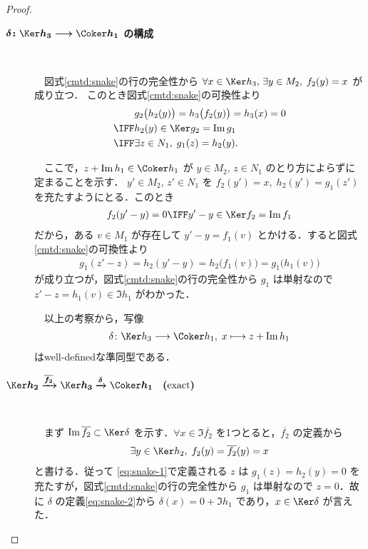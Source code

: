 \documentclass[algtopo_main]{subfiles}
\begin{document}
\begin{proof}
\begin{description}
		\item[\textbf{$\bm{\delta \colon \Ker h_3 \lto \Coker h_1}$ の構成}]　
		
		　図式\ref{cmtd:snake}の行の完全性から $\forall x \in \Ker h_3,\, \exists y \in M_2,\; f_2(y) = x$ が成り立つ．
		このとき図式\ref{cmtd:snake}の可換性より
		\begin{align}
			&g_2 \bigl( h_2(y) \bigr)  = h_3 \bigl( f_2(y) \bigr) = h_3(x) = 0 \\
			\IFF &h_2(y) \in \Ker g_2 = \Im g_1 \\
			\IFF &\exists z \in N_1,\; g_1(z) = h_2(y). \label{eq:snake-1}
		\end{align}
		
		　ここで，$z + \Im h_1 \in \Coker h_1$ が $y \in M_2,\, z \in N_1$ のとり方によらずに定まることを示す．
		$y' \in M_2,\, z' \in N_1$ を $f_2(y') = x,\; h_2(y') = g_1(z')$ を充たすようにとる．このとき
		\begin{align}
			f_2(y' - y) = 0 \IFF y' -y \in \Ker f_2 = \Im f_1
		\end{align}
		だから，ある $v \in M_1$ が存在して $y' -y = f_1(v)$ とかける．すると図式\ref{cmtd:snake}の可換性より
		\begin{align}
			g_1(z' - z) = h_2(y' - y) = h_2 \bigl( f_1(v) \bigr) = g_1 \bigl( h_1(v) \bigr) 
		\end{align}
		が成り立つが，図式\ref{cmtd:snake}の行の完全性から $g_1$ は単射なので $z' - z = h_1(v) \in \Im h_1$ がわかった．

		　以上の考察から，写像
		\begin{align}
			\label{eq:snake-2}
			\delta \colon \Ker h_3 \lto \Coker h_1,\; x \lmto z + \Im h_1
		\end{align}
		はwell-definedな準同型である．

		\item[\textbf{$\bm{\Ker h_2 \xrightarrow{\overline{f_2}} \Ker h_3 \xrightarrow{\delta} \Coker h_1 \quad (\text{exact})}$}]　
		
		　まず $\Im \overline{f_2} \subset \Ker \delta$ を示す．$\forall x \in \Im \overline{f_2}$ を1つとると，$\overline{f_2}$ の定義から
		\begin{align}
			\exists y \in \Ker h_2,\; f_2 (y) = \overline{f_2}(y) = x
		\end{align}
		と書ける．従って \eqref{eq:snake-1}で定義される $z$ は $g_1(z) = h_2(y) = 0$ を充たすが，図式\ref{cmtd:snake}の行の完全性から $g_1$ は単射なので $z = 0$．故に $\delta$ の定義\eqref{eq:snake-2}から $\delta(x) = 0 + \Im h_1$ であり，$x \in \Ker \delta$ が言えた．


\end{description}
\end{proof}
\end{document}
